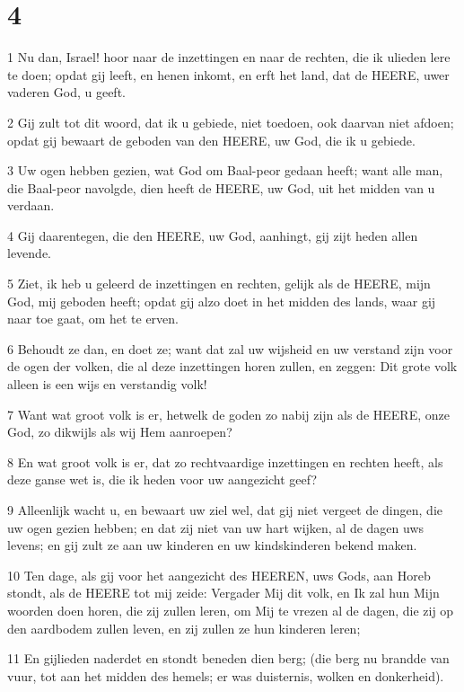 \chapter{4}

\par 1 Nu dan, Israel! hoor naar de inzettingen en naar de rechten, die ik ulieden lere te doen; opdat gij leeft, en henen inkomt, en erft het land, dat de HEERE, uwer vaderen God, u geeft.
\par 2 Gij zult tot dit woord, dat ik u gebiede, niet toedoen, ook daarvan niet afdoen; opdat gij bewaart de geboden van den HEERE, uw God, die ik u gebiede.
\par 3 Uw ogen hebben gezien, wat God om Baal-peor gedaan heeft; want alle man, die Baal-peor navolgde, dien heeft de HEERE, uw God, uit het midden van u verdaan.
\par 4 Gij daarentegen, die den HEERE, uw God, aanhingt, gij zijt heden allen levende.
\par 5 Ziet, ik heb u geleerd de inzettingen en rechten, gelijk als de HEERE, mijn God, mij geboden heeft; opdat gij alzo doet in het midden des lands, waar gij naar toe gaat, om het te erven.
\par 6 Behoudt ze dan, en doet ze; want dat zal uw wijsheid en uw verstand zijn voor de ogen der volken, die al deze inzettingen horen zullen, en zeggen: Dit grote volk alleen is een wijs en verstandig volk!
\par 7 Want wat groot volk is er, hetwelk de goden zo nabij zijn als de HEERE, onze God, zo dikwijls als wij Hem aanroepen?
\par 8 En wat groot volk is er, dat zo rechtvaardige inzettingen en rechten heeft, als deze ganse wet is, die ik heden voor uw aangezicht geef?
\par 9 Alleenlijk wacht u, en bewaart uw ziel wel, dat gij niet vergeet de dingen, die uw ogen gezien hebben; en dat zij niet van uw hart wijken, al de dagen uws levens; en gij zult ze aan uw kinderen en uw kindskinderen bekend maken.
\par 10 Ten dage, als gij voor het aangezicht des HEEREN, uws Gods, aan Horeb stondt, als de HEERE tot mij zeide: Vergader Mij dit volk, en Ik zal hun Mijn woorden doen horen, die zij zullen leren, om Mij te vrezen al de dagen, die zij op den aardbodem zullen leven, en zij zullen ze hun kinderen leren;
\par 11 En gijlieden naderdet en stondt beneden dien berg; (die berg nu brandde van vuur, tot aan het midden des hemels; er was duisternis, wolken en donkerheid).
